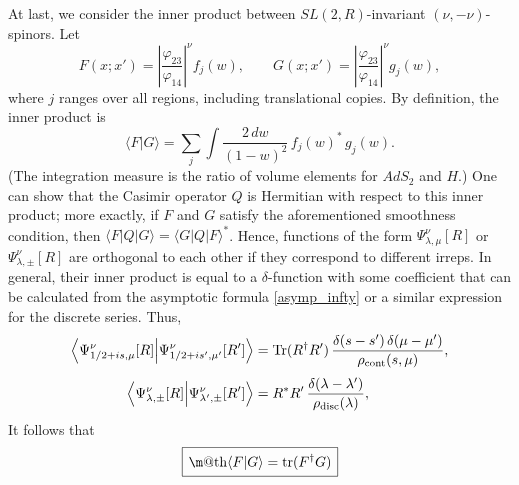 \documentclass[11pt]{article}
\makeatletter
\newcommand*{\wideboxed}[1]{\setlength{\fboxsep}{1ex}%
  \fbox{\m@th$\displaystyle#1$}}
\newcommand*{\bra}[1]{\langle{#1}|}
\newcommand*{\ket}[1]{|{#1}\rangle}
\newcommand*{\braket}[2]{\langle{#1}|{#2}\rangle}
\newcommand{\vp}{\varphi}
\newcommand{\RR}{\mathbb{R}}
\DeclareMathOperator{\tr}{tr}
\DeclareMathOperator{\Tr}{Tr}
\DeclareMathOperator{\SL}{SL}
\DeclareMathOperator{\AdS}{AdS}
\newcommand{\rcont}{\rho_{\text{cont}}}
\newcommand{\rdisc}{\rho_{\text{disc}}}
\def\widetilde#1{#1}%
\def\AdS{AdS}
\def\SL{SL}
\def\RR{R}
\makeatother
\begin{document}
At last, we consider the inner product between $\widetilde{\SL}(2,\RR)$-invariant $(\nu,-\nu)$-spinors. Let
\begin{equation}
F(x;x')=\left|\frac{\vp_{23}}{\vp_{14}}\right|^{\nu}f_j(w),\qquad
G(x;x')=\left|\frac{\vp_{23}}{\vp_{14}}\right|^{\nu}g_j(w),
\end{equation}
where $j$ ranges over all regions, including translational copies. By definition, the inner product is
\begin{equation}
\braket{F}{G}=\sum_{j}\int \frac{2\,dw}{(1-w)^2}\,f_j(w)^{*}\,g_j(w).
\end{equation}
(The integration measure is the ratio of volume elements for $\widetilde{\AdS}_2$ and $H$.) One can show that the Casimir operator $Q$ is Hermitian with respect to this inner product; more exactly, if $F$ and $G$ satisfy the aforementioned smoothness condition, then $\bra{F}Q\ket{G}=\bra{G}Q\ket{F}^{*}$. Hence, functions of the form $\Psi^{\nu}_{\lambda,\mu}[R]$ or $\Psi^{\nu}_{\lambda,\pm}[R]$ are orthogonal to each other if they correspond to different irreps. In general, their inner product is equal to a $\delta$-function with some coefficient that can be calculated from the asymptotic formula \eqref{asymp_infty} or a similar expression for the discrete series. Thus,
\begin{equation}
\begin{aligned}
\Bigl\langle\Psi^{\nu}_{1/2+is,\mu}[R] \Big|
\Psi^{\nu}_{1/2+is',\mu'}[R']\Bigr\rangle
&=\Tr(R^{\dag}R')\,\frac{\delta(s-s')\,\delta(\mu-\mu')}{\rcont(s,\mu)},
\\[3pt]
\Bigl\langle\Psi^{\nu}_{\lambda,\pm}[R] \Big|
\Psi^{\nu}_{\lambda',\pm}[R']\Bigr\rangle
&=R^*R'\,\frac{\delta(\lambda-\lambda')}{\rdisc(\lambda)},
\end{aligned}
\end{equation}
It follows that
\begin{equation}
\wideboxed{
\braket{F}{G}=\tr(F^{\dag}G)
}
\end{equation}




 
\end{document}
